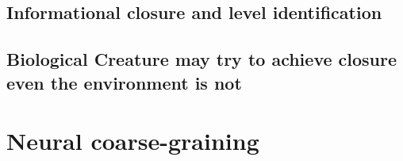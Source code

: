 \documentclass[utf8]{article}
\newcommand{\rewrite}[1]{\textcolor{ForestGreen}{\textit{"#1"}}\newline}
\begin{document}

		\subsection{Informational closure and level identification}


		\subsection{Biological Creature may try to achieve closure even the environment is not}



	\section{Neural coarse-graining}
\end{document}
